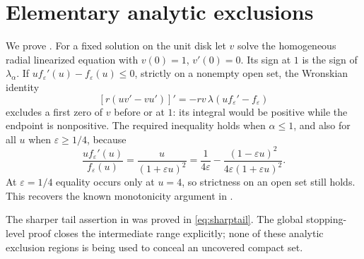\documentclass[11pt,a4paper]{report}
\begin{document}
\section{Elementary analytic exclusions}
We prove . For a fixed solution on the unit disk let $v$
solve the homogeneous radial linearized equation with $v(0)=1$, $v'(0)=0$.
Its sign at $1$ is the sign of $\lambda_\alpha$. If
$u f_\varepsilon'(u)-f_\varepsilon(u)\leq0$, strictly on a nonempty open set,
the Wronskian identity
\[
 [r(uv'-vu')]'=-r v\,\lambda(uf_\varepsilon'-f_\varepsilon)
\]
excludes a first zero of $v$ before or at $1$: its integral would be positive
while the endpoint is nonpositive. The required inequality holds when
$\alpha\leq1$, and also for all $u$ when $\varepsilon\geq1/4$, because
\[
 \frac{u f_\varepsilon'(u)}{f_\varepsilon(u)}
 =\frac{u}{(1+\varepsilon u)^2}
 =\frac1{4\varepsilon}
  -\frac{(1-\varepsilon u)^2}{4\varepsilon(1+\varepsilon u)^2}.
\]
At $\varepsilon=1/4$ equality occurs only at $u=4$, so strictness on an open
set still holds. This recovers the known monotonicity argument in
\autocite{KLO2017}.

The sharper tail assertion in  was proved in
\eqref{eq:sharptail}. The global stopping-level proof closes the intermediate
range explicitly; none of these analytic exclusion regions is being used
to conceal an uncovered compact set.
\end{document}

